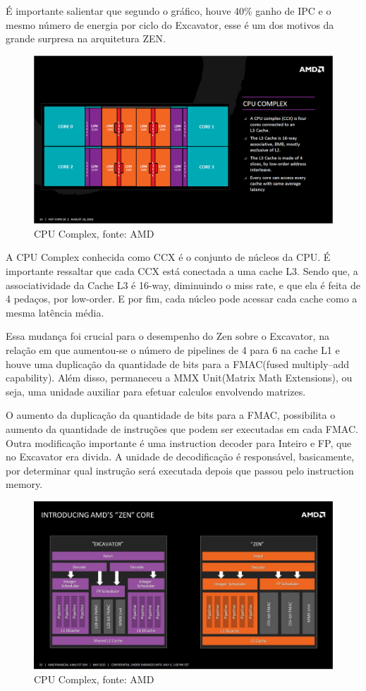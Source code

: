 \documentclass[12pt]{article}
\begin{document}
É importante salientar que segundo o gráfico, houve 40\% ganho de IPC e o mesmo número de energia por ciclo do Excavator, esse é um dos motivos da grande surpresa na arquitetura ZEN.


\begin{figure}[H]
\centering
\includegraphics[width=120mm,scale=0.8]{AMD-Zen_CPU-Complex.png}
\caption{CPU Complex, fonte: AMD}
\label{fig:AMD CORE}
\end{figure}

A CPU Complex conhecida como CCX é o conjunto de núcleos da CPU. É importante ressaltar que cada CCX está conectada a uma cache L3. Sendo que, a associatividade da Cache L3 é 16-way, diminuindo o miss rate, e que ela é feita de 4 pedaços, por low-order. E por fim, cada núcleo pode acessar cada cache como a mesma latência média.

Essa mudança foi crucial para o desempenho do Zen sobre o Excavator, na relação em que aumentou-se o número de pipelines de 4 para 6 na cache L1 e houve uma duplicação da quantidade de bits para a FMAC(fused multiply–add capability). Além disso, permaneceu a MMX Unit(Matrix Math Extensions), ou seja, uma unidade auxiliar para efetuar calculos envolvendo matrizes. 

O aumento da duplicação da quantidade de bits para a FMAC, possibilita o aumento da quantidade de instruções que podem ser executadas em cada FMAC. Outra modificação importante é uma instruction decoder para Inteiro e FP, que no Excavator era divida. A unidade de decodificação é responsável, basicamente, por determinar qual instrução será executada depois que passou pelo instruction memory.


\begin{figure}[H]
\centering
\includegraphics[width=115mm,scale=0.8]{zenex.jpg}
\caption{CPU Complex, fonte: AMD}
\label{fig:AMD CORE}
\end{figure}
\end{document}
